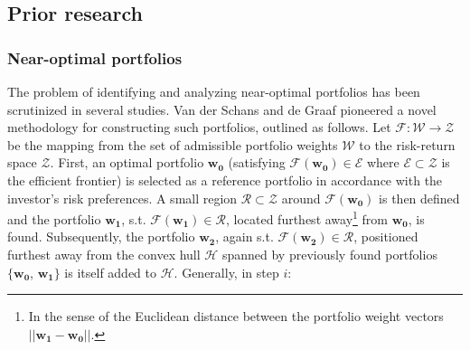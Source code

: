 \subsection{Prior research}

\subsubsection{Near-optimal portfolios}
The problem of identifying and analyzing near-optimal portfolios has been scrutinized in several studies. Van der Schans and de Graaf \cite{schans} pioneered a novel methodology for constructing such portfolios, outlined as follows. Let $\mathcal{F}: \mathcal{W} \rightarrow \mathcal{Z}$ be the mapping from the set of admissible portfolio weights $\mathcal{W}$ to the risk-return space $\mathcal{Z}$. First, an optimal portfolio $\boldsymbol{w_0}$ (satisfying $\mathcal{F}(\boldsymbol{w_0}) \in \mathcal{E}$ where $\mathcal{E} \subset \mathcal{Z}$ is the efficient frontier) is selected as a reference portfolio in accordance with the investor's risk preferences. A small region $\mathcal{R} \subset \mathcal{Z}$ around $\mathcal{F}(\boldsymbol{w_0})$ is then defined and the portfolio $\boldsymbol{w_1}$, s.t. $\mathcal{F}(\boldsymbol{w_1}) \in \mathcal{R}$, located furthest away\footnote{In the sense of the Euclidean distance between the portfolio weight vectors $||\boldsymbol{w_1}-\boldsymbol{w_0}||$.} from $\boldsymbol{w_0}$, is found. Subsequently, the portfolio $\boldsymbol{w_2}$, again s.t. $\mathcal{F}(\boldsymbol{w_2}) \in \mathcal{R}$, positioned furthest away from the convex hull $\mathcal{H}$ spanned by previously found portfolios $\{\boldsymbol{w_0}$, $\boldsymbol{w_1}\}$ is itself added to $\mathcal{H}$. Generally, in step $i$:

